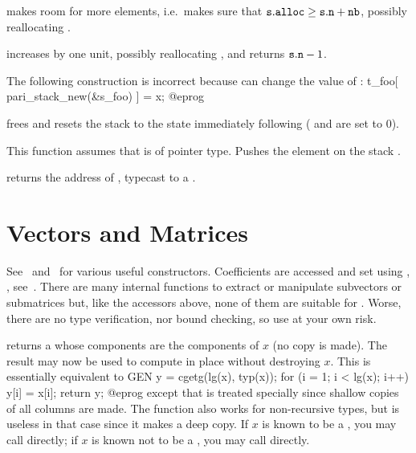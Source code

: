  makes room for 
more elements, i.e.~makes sure that ${\tt s.alloc}\geq{\tt s.n} + {\tt nb}$,
possibly reallocating .

 increases  by one unit,
possibly reallocating , and returns ${\tt s.n}-1$.

 The following construction is incorrect because
 can change the value of :
\bprog
t_foo[ pari_stack_new(&s_foo) ] = x;
@eprog

 frees  and resets the
stack to the state immediately following  ( and
 are set to $0$).

 This function assumes
that  is of pointer type. Pushes the element  on the stack
.

 returns the address of ,
typecast to a .

\section{Vectors and Matrices}

See~ and~ for various useful constructors.
Coefficients are accessed and set using , ,
see~. There are many internal functions to extract or
manipulate subvectors or submatrices but, like the accessors above, none of
them are suitable for . Worse, there are no type
verification, nor bound checking, so use at your own risk.

 returns a  whose components are the
components of $x$ (no copy is made). The result may now be used to compute in
place without destroying $x$. This is essentially equivalent to
\bprog
  GEN y = cgetg(lg(x), typ(x));
  for (i = 1; i < lg(x); i++) y[i] = x[i];
  return y;
@eprog\noindent
except that  is treated specially since shallow copies of all columns
are made. The function also works for non-recursive types, but is useless
in that case since it makes a deep copy. If $x$ is known to be a , you
may call  directly; if $x$ is known not to be a ,
you may call  directly.

